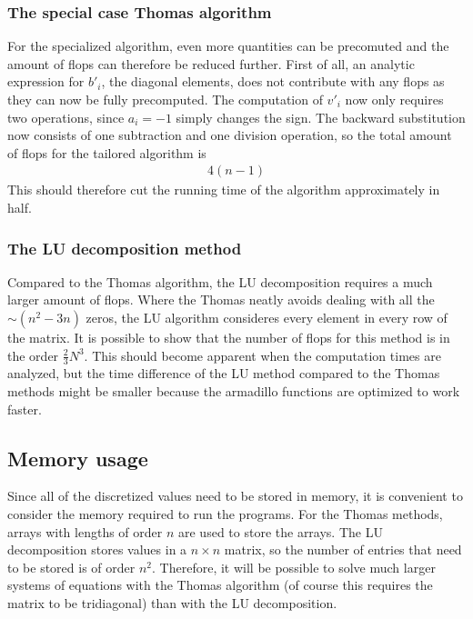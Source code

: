 \documentclass[aps,reprint]{revtex4-1}
\begin{document}
\subsubsection{The special case Thomas algorithm}
For the specialized algorithm, even more quantities can be precomuted and the
amount of flops can therefore be reduced further. First of all, an analytic
expression for $b'_i$, the diagonal elements, does not contribute with any flops
as they can now be fully precomputed. The computation of $v'_i$ now only requires two
operations, since $a_i = -1$ simply changes the sign. The backward substitution
now consists of one subtraction and one division operation, so the total amount of
flops for the tailored algorithm is
\begin{align}
  4(n-1)
\end{align}
This should therefore cut the running time of the algorithm approximately in half.
\subsubsection{The LU decomposition method}
Compared to the Thomas algorithm, the LU decomposition requires a much larger
amount of flops. Where the Thomas neatly avoids dealing with all the $\sim (n^2 - 3n)$
zeros, the LU algorithm consideres every element in every row of the matrix. It is
possible to show that the number of flops for this method is in the order $\frac{2}{3}N^3$.
This should become apparent when the computation times are analyzed, but the time difference
of the LU method compared to the Thomas methods might be smaller because the armadillo
functions are optimized to work faster.

\subsection{Memory usage}
Since all of the discretized values need to be stored in memory, it is convenient
to consider the memory required to run the programs. For the Thomas methods,
arrays with lengths of order $n$ are used to store the arrays. The LU decomposition
stores values in a $n \times n$ matrix, so the number of entries that need to
be stored is of order $n^2$. Therefore, it will be possible to solve much
larger systems of equations with the Thomas algorithm (of course this requires
the matrix to be tridiagonal) than with the LU decomposition.
\end{document}
